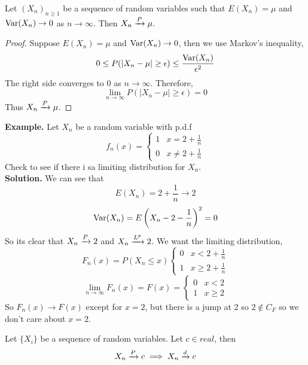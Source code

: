     \begin{theorem}\label{theorem:5.0.1}
        Let $(X_n)_{n\geq 1}$ be a sequence of random variables such that $E(X_n) = \mu$ and $\operatorname{Var}(X_n) \rightarrow 0$ as $n \rightarrow \infty$. Then $X_n \xrightarrow{P} \mu$.
    \end{theorem}
    \begin{proof}
        Suppose $E(X_n) = \mu$ and $\operatorname{Var}(X_n) \rightarrow 0$, then we use Markov's inequality,
        \[0 \leq P(|X_n - \mu| \geq \epsilon) \leq \frac{\operatorname{Var}(X_n)}{\epsilon^2}\]
        The right side converges to 0 as $n \rightarrow \infty$. Therefore,
        \[\lim_{n\rightarrow \infty} P(|X_n - \mu| \geq \epsilon) = 0\]
        Thus $X_n \xrightarrow{P} \mu$. 
    \end{proof}
    \textbf{Example.} Let $X_n$ be a random variable with p.d.f 
    \[f_n(x) = \begin{cases}
        1 & x = 2 + \frac{1}{n}\\
        0 & x \neq 2 + \frac{1}{n}
    \end{cases}\]
    Check to see if there i sa limiting distribution for $X_n$.\\[2ex]
    \textbf{Solution.} We can see that 
    \[E(X_n) = 2 + \frac{1}{n} \rightarrow 2\]
    \[\operatorname{Var}(X_n) = E\left(X_n - 2 - \frac{1}{n}\right)^2 = 0\]
    So its clear that $X_n \xrightarrow{P} 2$ and $X_n \xrightarrow{L^{p}} 2$. We want the limiting distribution,
    \[F_n(x) = P(X_n \leq x) \begin{cases}
        0 & x < 2+\frac{1}{n}\\
        1 & x \geq 2 + \frac{1}{n}
    \end{cases}\] 
    \[\lim_{n\rightarrow \infty}F_n(x) = F(x) = \begin{cases}
        0 & x < 2 \\
        1 & x \geq 2
    \end{cases}\]
    So $F_n(x) \rightarrow F(x)$ except for $x = 2$, but there is a jump at 2 so $2 \not\in C_F$ so we don't care about $x=2$. 
    \begin{theorem}
        Let $\{X_i\}$ be a sequence of random variables. Let $c \in real$, then 
        \[X_n \xrightarrow{P} c \implies X_n \xrightarrow{d} c\]
    \end{theorem}
